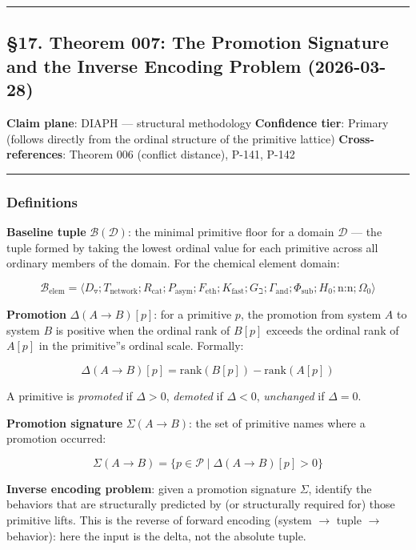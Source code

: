 \documentclass[12pt,a4paper]{article}
\newcommand{\pilcrow}{\S}
\begin{document}
\begin{center}
\rule{0.5\textwidth}{0.4pt}
\end{center}

\subsection{\pilcrow{}17. Theorem 007: The Promotion Signature and the Inverse Encoding Problem (2026-03-28)}

\textbf{Claim plane}: DIAPH --- structural methodology
\textbf{Confidence tier}: Primary (follows directly from the ordinal structure of the primitive lattice)
\textbf{Cross-references}: Theorem 006 (conflict distance), P-141, P-142

\begin{center}
\rule{0.5\textwidth}{0.4pt}
\end{center}

\subsubsection{Definitions}

\textbf{Baseline tuple} $\mathcal{B}(\mathcal{D})$: the minimal primitive floor for a domain $\mathcal{D}$ --- the tuple formed by taking the lowest ordinal value for each primitive across all ordinary members of the domain. For the chemical element domain:

\[\mathcal{B}_\text{elem} = \langle D_{\triangledown}; T_\text{network}; R_\text{cat}; P_\text{asym}; F_\text{eth}; K_\text{fast}; G_{\beth}; \Gamma_\text{and}; \Phi_\text{sub}; H_0; \text{n:n}; \Omega_0 \rangle\]

\textbf{Promotion} $\Delta(A \to B)[p]$: for a primitive $p$, the promotion from system $A$ to system $B$ is positive when the ordinal rank of $B[p]$ exceeds the ordinal rank of $A[p]$ in the primitive''s ordinal scale. Formally:

\[\Delta(A \to B)[p] = \text{rank}(B[p]) - \text{rank}(A[p])\]

A primitive is \emph{promoted} if $\Delta > 0$, \emph{demoted} if $\Delta < 0$, \emph{unchanged} if $\Delta = 0$.

\textbf{Promotion signature} $\Sigma(A \to B)$: the set of primitive names where a promotion occurred:

\[\Sigma(A \to B) = \{p \in \mathcal{P} \mid \Delta(A \to B)[p] > 0\}\]

\textbf{Inverse encoding problem}: given a promotion signature $\Sigma$, identify the behaviors that are structurally predicted by (or structurally required for) those primitive lifts. This is the reverse of forward encoding (system $\rightarrow$ tuple $\rightarrow$ behavior): here the input is the delta, not the absolute tuple.
\end{document}
